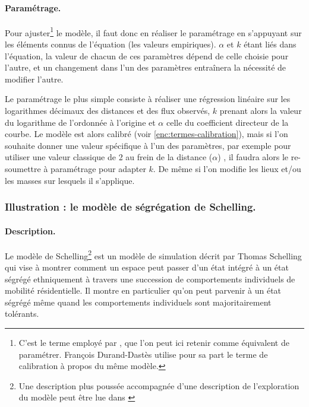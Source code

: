 \paragraph{Paramétrage.}
Pour \og ajuster\fg{}\footnote{C'est le terme employé par \autocite{pumain_les_2001}, que l'on peut ici retenir comme équivalent de paramétrer. François Durand-Dastès  \autocite[298]{durand1995modeles} utilise pour sa part le terme de calibration à propos du même modèle.} le modèle, il faut donc en réaliser le paramétrage en s'appuyant sur les éléments connus de l'équation (les valeurs empiriques).
$\alpha$ et $k$ étant liés dans l'équation, la valeur de chacun de ces paramètres dépend de celle choisie pour l'autre, et un changement dans l'un des paramètres entraînera la nécessité de modifier l'autre.

Le paramétrage le plus simple consiste à réaliser une régression linéaire sur les logarithmes décimaux des distances et des flux observés, $k$ prenant alors la valeur du logarithme de l'ordonnée à l'origine et $\alpha$ celle du coefficient directeur de la courbe.	
Le modèle est alors calibré (voir \cref{enc:termes-calibration}), mais si l'on souhaite donner une valeur spécifique à l'un des paramètres, par exemple pour utiliser une valeur classique de 2 au frein de la distance ($\alpha$) \autocite{pumain_modegravitaire_2004}, il faudra alors le re-soumettre à paramétrage pour adapter $k$. De même si l'on modifie les lieux et/ou les masses sur lesquels il s'applique.


\subsubsection{Illustration : le modèle de ségrégation de Schelling.\label{desc:schelling}}

\paragraph{Description.}
Le modèle de Schelling\footnote{Une description plus poussée accompagnée d'une description de l'exploration du modèle peut être lue dans \autocite{daude_comparaison_2006}} est un modèle de simulation décrit par Thomas Schelling \autocite{schelling_dynamic_1971} qui vise à montrer comment un espace peut passer d'un état intégré à un état ségrégé ethniquement à travers une succession de comportements individuels de mobilité résidentielle.
Il montre en particulier qu'on peut parvenir à un état ségrégé même quand les comportements individuels sont majoritairement tolérants.

